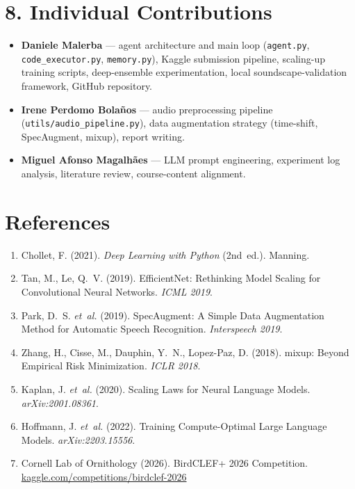 \documentclass[11pt,a4paper]{article}
\begin{document}
\section*{8. Individual Contributions}
\begin{itemize}
\item \textbf{Daniele Malerba} --- agent architecture and main loop (\texttt{agent.py}, \texttt{code\_executor.py}, \texttt{memory.py}), Kaggle submission pipeline, scaling-up training scripts, deep-ensemble experimentation, local soundscape-validation framework, GitHub repository.
\item \textbf{Irene Perdomo Bola\~nos} --- audio preprocessing pipeline (\texttt{utils/audio\_pipeline.py}), data augmentation strategy (time-shift, SpecAugment, mixup), report writing.
\item \textbf{Miguel Afonso Magalh\~aes} --- LLM prompt engineering, experiment log analysis, literature review, course-content alignment.
\end{itemize}

\section*{References}
\begin{small}
\begin{enumerate}
\item Chollet, F. (2021). \emph{Deep Learning with Python} (2nd~ed.). Manning.
\item Tan, M., Le, Q.~V. (2019). EfficientNet: Rethinking Model Scaling for Convolutional Neural Networks. \emph{ICML 2019}.
\item Park, D.~S. \emph{et~al.} (2019). SpecAugment: A Simple Data Augmentation Method for Automatic Speech Recognition. \emph{Interspeech 2019}.
\item Zhang, H., Cisse, M., Dauphin, Y.~N., Lopez-Paz, D. (2018). mixup: Beyond Empirical Risk Minimization. \emph{ICLR 2018}.
\item Kaplan, J. \emph{et~al.} (2020). Scaling Laws for Neural Language Models. \emph{arXiv:2001.08361}.
\item Hoffmann, J. \emph{et~al.} (2022). Training Compute-Optimal Large Language Models. \emph{arXiv:2203.15556}.
\item Cornell Lab of Ornithology (2026). BirdCLEF+ 2026 Competition. \href{https://www.kaggle.com/competitions/birdclef-2026}{kaggle.com/competitions/birdclef-2026}
\end{enumerate}
\end{small}
\end{document}
